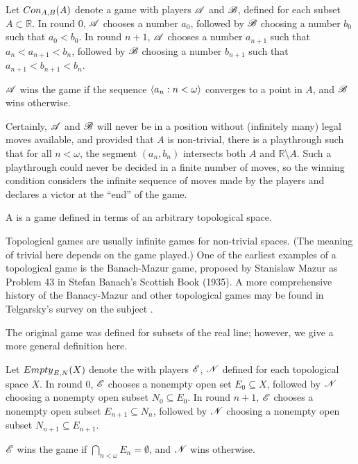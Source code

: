 \begin{game}
  Let ${Con}_{A,B}(A)$ denote a game with players $\mathscr{A}$ and $\mathscr{B}$,
  defined for each subset $A\subset \mathbb{R}$.
  In round $0$, $\mathscr{A}$ chooses a number $a_0$, followed by $\mathscr{B}$ choosing
  a number $b_0$ such that $a_0<b_0$.
  In round $n+1$, $\mathscr{A}$ chooses a number $a_{n+1}$ such that 
  $a_n<a_{n+1}<b_n$, followed by $\mathscr{B}$ choosing a number $b_{n+1}$ such that
  $a_{n+1}<b_{n+1}<b_n$.

  $\mathscr{A}$ wins the game if the sequence $\langle a_n:n<\omega\rangle$ converges to a 
  point in $A$, and $\mathscr{B}$ wins otherwise.
\end{game}

Certainly, $\mathscr{A}$ and $\mathscr{B}$ will never be in
a position without (infinitely many) legal moves available, and provided that
$A$ is non-trivial, there is a playthrough such that for all $n<\omega$,
the segment $(a_n,b_n)$ intersects both $A$ and $\mathbb{R}\setminus A$. 
Such a playthrough could never be decided in a finite number of moves,
so the winning condition considers the infinite sequence of moves made by the
players and declares a victor at the ``end'' of the game.

\begin{defn}
  A  is a game defined in terms of an arbitrary
  topological space.
\end{defn}

Topological games are usually infinite games for non-trivial spaces.
(The meaning of trivial here depends on the game played.)
One of the earliest examples
of a topological game is the Banach-Mazur game, proposed by Stanislaw Mazur
as Problem 43 in Stefan Banach's Scottish Book (1935). A more comprehensive
history of the Banacy-Mazur and other topological games may be found in 
Telgarsky's survey on the subject \cite{telgarsky}.

The original game was defined for subsets of the real line; however, 
we give a more general definition here.

\begin{game}
  Let ${Empty}_{E,N}(X)$ denote the  with players $\mathscr{E}$,
  $\mathscr{N}$ defined for each topological space $X$.
  In round $0$, $\mathscr{E}$ chooses a nonempty open set $E_0\subseteq X$, followed
  by $\mathscr{N}$ choosing a nonempty open subset $N_0\subseteq E_0$.
  In round $n+1$, $\mathscr{E}$ chooses a nonempty open subset $E_{n+1}\subseteq N_n$, 
  followed by $\mathscr{N}$ choosing a nonempty open subset 
  $N_{n+1}\subseteq E_{n+1}$.

  $\mathscr{E}$ wins the game if $\bigcap_{n<\omega} E_n = \emptyset$, 
  and $\mathscr{N}$ wins otherwise.
\end{game}

